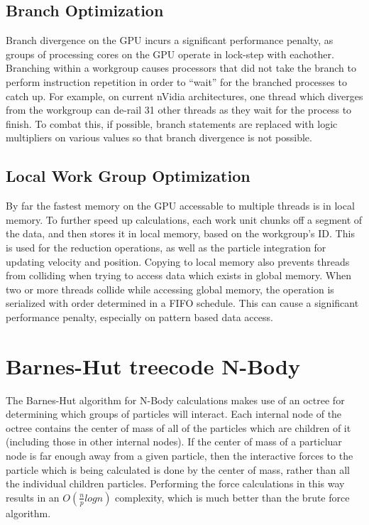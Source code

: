 \documentclass[fleqn,10pt]{SelfArx} %
\begin{document}
\subsection{Branch Optimization}
Branch divergence on the GPU incurs a significant performance penalty, as groups of processing cores on the GPU operate in lock-step with eachother. Branching within a workgroup causes processors that did not take the branch to perform instruction repetition in order to “wait” for the branched processes to catch up. For example, on current nVidia architectures, one thread which diverges from the workgroup can de-rail 31 other threads as they wait for the process to finish. To combat this, if possible, branch statements are replaced with logic multipliers on various values so that branch divergence is not possible.

\subsection{Local Work Group Optimization}
By far the fastest memory on the GPU accessable to multiple threads is in local memory. To further speed up calculations, each work unit chunks off a segment of the data, and then stores it in local memory, based on the workgroup’s ID. This is used for the reduction operations, as well as the particle integration for updating velocity and position. Copying to local memory also prevents threads from colliding when trying to access data which exists in global memory. When two or more threads collide while accessing global memory, the operation is serialized with order determined in a FIFO schedule. This can cause a significant performance penalty, especially on pattern based data access.




\section{Barnes-Hut treecode N-Body}
The Barnes-Hut algorithm for N-Body calculations makes use of an octree for determining which groups of particles will interact. Each internal node of the octree contains the center of mass of all of the particles which are children of it (including those in other internal nodes). If the center of mass of a particluar node is far enough away from a given particle, then the interactive forces to the particle which is being calculated is done by the center of mass, rather than all the individual children particles. Performing the force calculations in this way results in an $O(\frac{n}{p} log n)$ complexity, which is much better than the brute force algorithm.
\end{document}
